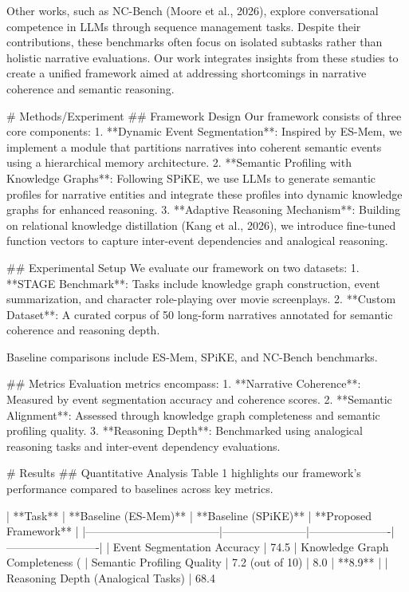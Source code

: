Other works, such as NC-Bench (Moore et al., 2026), explore conversational competence in LLMs through sequence management tasks. Despite their contributions, these benchmarks often focus on isolated subtasks rather than holistic narrative evaluations. Our work integrates insights from these studies to create a unified framework aimed at addressing shortcomings in narrative coherence and semantic reasoning.

# Methods/Experiment  
## Framework Design  
Our framework consists of three core components:  
1. **Dynamic Event Segmentation**: Inspired by ES-Mem, we implement a module that partitions narratives into coherent semantic events using a hierarchical memory architecture.  
2. **Semantic Profiling with Knowledge Graphs**: Following SPiKE, we use LLMs to generate semantic profiles for narrative entities and integrate these profiles into dynamic knowledge graphs for enhanced reasoning.  
3. **Adaptive Reasoning Mechanism**: Building on relational knowledge distillation (Kang et al., 2026), we introduce fine-tuned function vectors to capture inter-event dependencies and analogical reasoning.  

## Experimental Setup  
We evaluate our framework on two datasets:  
1. **STAGE Benchmark**: Tasks include knowledge graph construction, event summarization, and character role-playing over movie screenplays.  
2. **Custom Dataset**: A curated corpus of 50 long-form narratives annotated for semantic coherence and reasoning depth.  

Baseline comparisons include ES-Mem, SPiKE, and NC-Bench benchmarks.  

## Metrics  
Evaluation metrics encompass:  
1. **Narrative Coherence**: Measured by event segmentation accuracy and coherence scores.  
2. **Semantic Alignment**: Assessed through knowledge graph completeness and semantic profiling quality.  
3. **Reasoning Depth**: Benchmarked using analogical reasoning tasks and inter-event dependency evaluations.

# Results  
## Quantitative Analysis  
Table 1 highlights our framework's performance compared to baselines across key metrics.  

| **Task**                          | **Baseline (ES-Mem)** | **Baseline (SPiKE)** | **Proposed Framework** |  
|------------------------------------|-----------------------|----------------------|-------------------------|  
| Event Segmentation Accuracy        | 74.5%
| Knowledge Graph Completeness (%
| Semantic Profiling Quality         | 7.2 (out of 10)      | 8.0                 | **8.9**                |  
| Reasoning Depth (Analogical Tasks) | 68.4%

